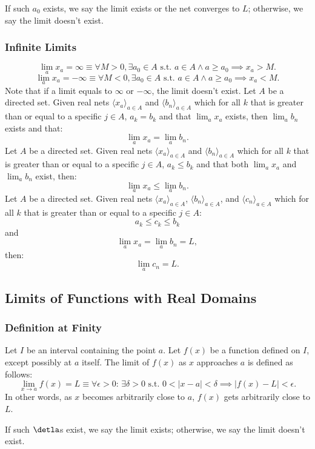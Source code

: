 \documentclass[a4paper,12pt]{report}
\begin{document}
If such $a_0$ exists, we say the limit exists or the net converges to $L$; otherwise, we say the limit doesn't exist.
\subsubsection{Infinite Limits}
\[\lim_{a}x_a=\infty \equiv \forall M > 0, \exists a_0 \in A \text{\ s.t.\ } a\in A\land a\geq a_0 \implies x_a > M.\]
\[\lim_{a}x_a=-\infty \equiv \forall M < 0, \exists a_0 \in A \text{\ s.t.\ } a\in A\land a\geq a_0 \implies x_a < M.\]
Note that if a limit equals to $\infty$ or $-\infty$, the limit doesn't exist.
Let $A$ be a directed set. Given real nets $\langle x_a\rangle_{a\in A}$ and $\langle b_n\rangle_{a\in A}$ which for all $k$ that is greater than or equal to a specific $j\in A$, $a_k=b_k$ and that $\lim_{a}x_a$ exists, then $\lim_{a}b_n$ exists and that:
\[\lim_{a}x_a=\lim_{a}b_n.\]
Let $A$ be a directed set. Given real nets $\langle x_a\rangle_{a\in A}$ and $\langle b_n\rangle_{a\in A}$ which for all $k$ that is greater than or equal to a specific $j\in A$, $a_k\leq b_k$ and that both $\lim_{a}x_a$ and $\lim_{a}b_n$ exist, then:
\[\lim_{a}x_a\leq\lim_{a}b_n.\]
Let $A$ be a directed set. Given real nets $\langle x_a\rangle_{a\in A}$, $\langle b_n\rangle_{a\in A}$, and $\langle c_n\rangle_{a\in A}$ which for all $k$ that is greater than or equal to a specific $j\in A$:
\[a_k\leq c_k\leq b_k\]
and
\[\lim_{a}x_a=\lim_{a}b_n=L,\]
then: 
\[\lim_{a}c_n=L.\]
\subsection{Limits of Functions with Real Domains}
\subsubsection{Definition at Finity}
Let \(I\) be an interval containing the point \(a\). Let \( f(x) \) be a function defined on \(I\), except possibly at \(a\) itself. The limit of \( f(x) \) as \( x \) approaches \( a \) is defined as follows:
\[\lim_{x \to a} f(x) = L \equiv \forall \epsilon > 0:\, \exists \delta > 0 \text{\ s.t.\ } 0 < |x - a| < \delta \implies |f(x) - L| < \epsilon.\]
In other words, as \(x\) becomes arbitrarily close to \(a\), \(f(x)\) gets arbitrarily close to \(L\).

If such $\detla$s exist, we say the limit exists; otherwise, we say the limit doesn't exist.
\end{document}

